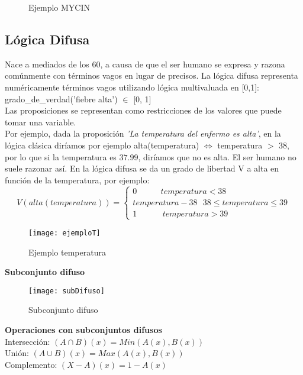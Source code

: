 \documentclass[12pt]{article}
\begin{document}
\begin{figure}[H]
 \centering
 \caption{Ejemplo MYCIN}
 \label{f:mycin}
\end{figure}

\subsection{Lógica Difusa}
Nace a mediados de los 60, a causa de que el ser humano se expresa y razona comúnmente con términos vagos en lugar de precisos. La lógica difusa representa numéricamente términos vagos utilizando lógica multivaluada en [0,1]:\\
grado\_de\_verdad('fiebre alta') $\in$ [0,	1]\\
Las proposiciones se representan como restricciones de los valores que puede tomar una variable.\\

Por ejemplo, dada la proposición \textit{'La temperatura del enfermo es alta'}, en la lógica clásica diríamos por ejemplo alta(temperatura) $\Leftrightarrow$ temperatura $>$ 38, por lo que si la temperatura es $37.99$, diríamos que no es alta. El ser humano no suele razonar así. En la lógica difusa se da un grado de libertad V a alta en función de la temperatura, por ejemplo:
\begin{equation}
V(alta(temperatura)) =   
  \left\lbrace
  \begin{array}{l}
     0 \ \ \ \ \ \ \ \ \ \ \ \ \ temperatura < 38 \\
     temperatura-38 \ \ \ 38 \leq temperatura \leq 39 \\
     1 \ \ \ \ \ \ \ \ \ \ \ \ \ \ temperatura > 39
  \end{array}
  \right.
\end{equation}

\begin{figure}[H]
\centering
\texttt{[image: ejemploT]}
\caption{Ejemplo temperatura}
\label{fig:ejemploT}
\end{figure}

\textbf{Subconjunto difuso}
\begin{figure}[H]
\centering
\texttt{[image: subDifuso]}
\caption{Subconjunto difuso}
\label{fig:subDifuso}
\end{figure}

\textbf{Operaciones con subconjuntos difusos}\\
Intersección: $(A \cap B)(x)=Min(A(x),B(x))$\\
Unión: $(A \cup B)(x)=Max(A(x),B(x))$\\
Complemento: $(X-A)(x)=1-A(x)$
\end{document}
